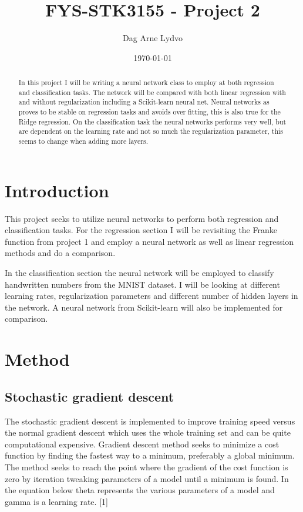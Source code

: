 \documentclass[reprint,english,notitlepage]{revtex4-2}  %
\begin{document}
\title{FYS-STK3155 - Project 2}   %
\author{Dag Arne Lydvo}               %
\date{\today}                             %
\noaffiliation                            %
\begin{abstract}                          %
In this project I will be writing a neural network class to employ at both regression and classification tasks. The network will be compared with both linear regression with and without regularization including a Scikit-learn neural net. Neural networks as proves to be stable on regression tasks and avoids over fitting, this is also true for the Ridge regression. On the classification task the neural networks performs very well, but are dependent on the learning rate and not so much the regularization parameter, this seems to change when adding more layers. 
\end{abstract}                            %
\maketitle                                %


\section{Introduction}
This project seeks to utilize neural networks to perform both regression and classification tasks. For the regression section I will be revisiting the Franke function from project 1 and employ a neural network as well as linear regression methods and do a comparison. 

In the classification section the neural network will be employed to classify handwritten numbers from the MNIST dataset. I will be looking at different learning rates, regularization parameters and different number of hidden layers in the network. A neural network from Scikit-learn will also be implemented for comparison. 


\section{Method}
\subsection{Stochastic gradient descent}
The stochastic gradient descent is implemented to improve training speed versus the normal gradient descent which uses the whole training set and can be quite computational expensive. 
Gradient descent method seeks to minimize a cost function by finding the fastest way to a minimum, preferably a global minimum. The method seeks to reach the point where the gradient of the cost function is zero by iteration tweaking parameters of a model until a minimum is found. In the equation below theta represents the various parameters of a model and gamma is a learning rate. [1]
\end{document}
